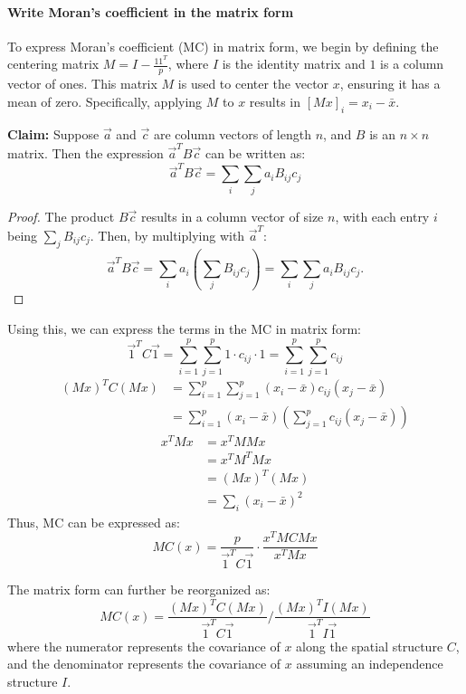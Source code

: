 \documentclass[12pt]{article}
\begin{document}
\paragraph{Write Moran's coefficient in the matrix form}

To express Moran's coefficient (MC) in matrix form, we begin by defining the centering matrix \( M = I - \frac{1 1^T}{p} \), where \( I \) is the identity matrix and \( 1 \) is a column vector of ones. This matrix \( M \) is used to center the vector \( x \), ensuring it has a mean of zero. Specifically, applying \( M \) to \( x \) results in \( [M x]_i = x_i - \bar{x} \).

{\bf Claim:} Suppose \( \vec{a} \) and \( \vec{c} \) are column vectors of length \( n \), and \( B \) is an \( n \times n \) matrix. Then the expression \( \vec{a}^T B \vec{c} \) can be written as:
\[
  \vec{a}^T B \vec{c} = \sum_i \sum_j a_i B_{ij} c_j
\]
\begin{proof}
  The product \( B \vec{c} \) results in a column vector of size \( n \), with each entry \( i \) being \( \sum_j B_{ij} c_j \). Then, by multiplying with \( \vec{a}^T \):
  \[
    \vec{a}^T B \vec{c} = \sum_i a_i \left( \sum_j B_{ij} c_j \right) = \sum_i \sum_j a_i B_{ij} c_j.
  \]
\end{proof}

Using this, we can express the terms in the MC in matrix form:
\[
  \vec{1}^T C \vec{1} = \sum_{i=1}^p \sum_{j=1}^p 1 \cdot c_{i j} \cdot 1 = \sum_{i=1}^p \sum_{j=1}^p c_{i j} 
\]
\begin{align*}
  (M x)^T C (M x) & = \sum_{i=1}^p \sum_{j=1}^p (x_i - \bar{x}) c_{ij} (x_{j} - \bar{x}) \\
                  & = \sum_{i=1}^p (x_i - \bar{x}) \left( \sum_{j=1}^p c_{ij} (x_j - \bar{x}) \right)
\end{align*}
\begin{align*}
  x^T M x & = x^T M M x \\
          & = x^T M^T M x \\
          & = (M x)^T (M x) \\
          & = \sum_i (x_i - \bar{x})^2
\end{align*}
Thus, MC can be expressed as:
\[
  M C(x) = \frac{p}{\vec{1}^T C \vec{1}} \cdot \frac{x^T M C M x}{x^T M x}
\]

The matrix form can further be reorganized as:
\[
  M C (x) = \frac{(M x)^T C (M x)}{\vec{1}^T C \vec{1}} / \frac{(M x)^T I (M x)}{\vec{1}^T I \vec{1}}
\]
where the numerator represents the covariance of \( x \) along the spatial structure \( C \), and the denominator represents the covariance of \( x \) assuming an independence structure \( I \).
\end{document}
